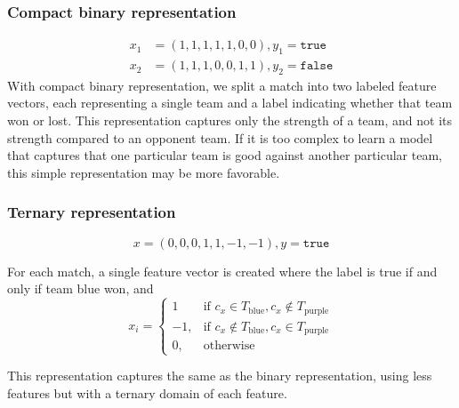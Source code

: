 \subsubsection{Compact binary representation}
\begin{align*}
  x_1 &= (1,1,1,1,1,0,0), y_1 = \texttt{true} \\
  x_2 &= (1,1,1,0,0,1,1), y_2 =\texttt{false}
\end{align*}
With compact binary representation, we split a match into two labeled feature vectors, each representing a single team and a label indicating whether that team won or lost.
This representation captures only the strength of a team, and not its strength compared to an opponent team.
If it is too complex to learn a model that captures that one particular team is good against another particular team, this simple representation may be more favorable.

\subsubsection{Ternary representation}

\[x = (0,0,0,1,1,-1,-1), y = \texttt{true}\]

For each match, a single feature vector is created where the label is true if and only if team blue won, and
\[
    x_i = 
\begin{cases}
    1 				 & \text{if } c_x \in T_\text{blue}, c_x \not\in T_\text{purple}\\
    -1,              & \text{if } c_x \not\in T_\text{blue}, c_x \in T_\text{purple}\\
    0,              & \text{otherwise}
\end{cases}
\]

This representation captures the same as the binary representation, using less features but with a ternary domain of each feature.